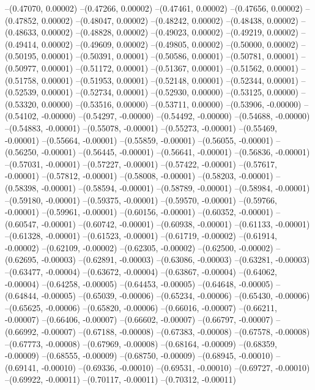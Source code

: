 --(0.47070, 0.00002)
--(0.47266, 0.00002)
--(0.47461, 0.00002)
--(0.47656, 0.00002)
--(0.47852, 0.00002)
--(0.48047, 0.00002)
--(0.48242, 0.00002)
--(0.48438, 0.00002)
--(0.48633, 0.00002)
--(0.48828, 0.00002)
--(0.49023, 0.00002)
--(0.49219, 0.00002)
--(0.49414, 0.00002)
--(0.49609, 0.00002)
--(0.49805, 0.00002)
--(0.50000, 0.00002)
--(0.50195, 0.00001)
--(0.50391, 0.00001)
--(0.50586, 0.00001)
--(0.50781, 0.00001)
--(0.50977, 0.00001)
--(0.51172, 0.00001)
--(0.51367, 0.00001)
--(0.51562, 0.00001)
--(0.51758, 0.00001)
--(0.51953, 0.00001)
--(0.52148, 0.00001)
--(0.52344, 0.00001)
--(0.52539, 0.00001)
--(0.52734, 0.00001)
--(0.52930, 0.00000)
--(0.53125, 0.00000)
--(0.53320, 0.00000)
--(0.53516, 0.00000)
--(0.53711, 0.00000)
--(0.53906, -0.00000)
--(0.54102, -0.00000)
--(0.54297, -0.00000)
--(0.54492, -0.00000)
--(0.54688, -0.00000)
--(0.54883, -0.00001)
--(0.55078, -0.00001)
--(0.55273, -0.00001)
--(0.55469, -0.00001)
--(0.55664, -0.00001)
--(0.55859, -0.00001)
--(0.56055, -0.00001)
--(0.56250, -0.00001)
--(0.56445, -0.00001)
--(0.56641, -0.00001)
--(0.56836, -0.00001)
--(0.57031, -0.00001)
--(0.57227, -0.00001)
--(0.57422, -0.00001)
--(0.57617, -0.00001)
--(0.57812, -0.00001)
--(0.58008, -0.00001)
--(0.58203, -0.00001)
--(0.58398, -0.00001)
--(0.58594, -0.00001)
--(0.58789, -0.00001)
--(0.58984, -0.00001)
--(0.59180, -0.00001)
--(0.59375, -0.00001)
--(0.59570, -0.00001)
--(0.59766, -0.00001)
--(0.59961, -0.00001)
--(0.60156, -0.00001)
--(0.60352, -0.00001)
--(0.60547, -0.00001)
--(0.60742, -0.00001)
--(0.60938, -0.00001)
--(0.61133, -0.00001)
--(0.61328, -0.00001)
--(0.61523, -0.00001)
--(0.61719, -0.00002)
--(0.61914, -0.00002)
--(0.62109, -0.00002)
--(0.62305, -0.00002)
--(0.62500, -0.00002)
--(0.62695, -0.00003)
--(0.62891, -0.00003)
--(0.63086, -0.00003)
--(0.63281, -0.00003)
--(0.63477, -0.00004)
--(0.63672, -0.00004)
--(0.63867, -0.00004)
--(0.64062, -0.00004)
--(0.64258, -0.00005)
--(0.64453, -0.00005)
--(0.64648, -0.00005)
--(0.64844, -0.00005)
--(0.65039, -0.00006)
--(0.65234, -0.00006)
--(0.65430, -0.00006)
--(0.65625, -0.00006)
--(0.65820, -0.00006)
--(0.66016, -0.00007)
--(0.66211, -0.00007)
--(0.66406, -0.00007)
--(0.66602, -0.00007)
--(0.66797, -0.00007)
--(0.66992, -0.00007)
--(0.67188, -0.00008)
--(0.67383, -0.00008)
--(0.67578, -0.00008)
--(0.67773, -0.00008)
--(0.67969, -0.00008)
--(0.68164, -0.00009)
--(0.68359, -0.00009)
--(0.68555, -0.00009)
--(0.68750, -0.00009)
--(0.68945, -0.00010)
--(0.69141, -0.00010)
--(0.69336, -0.00010)
--(0.69531, -0.00010)
--(0.69727, -0.00010)
--(0.69922, -0.00011)
--(0.70117, -0.00011)
--(0.70312, -0.00011)
